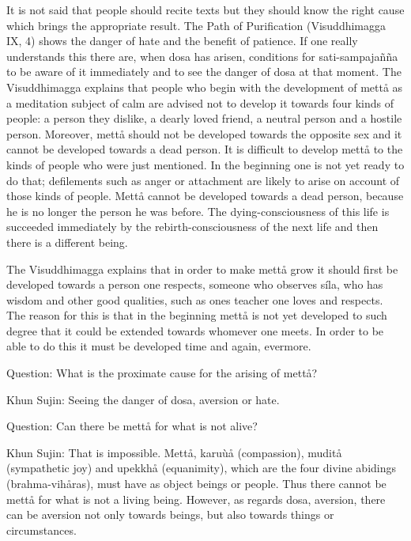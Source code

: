 \documentclass[12pt,twoside]{article}
\begin{document}
\bigskip

It is not said that people should recite texts but they should know the
right cause which brings the appropriate result. The
{\textasciigrave}{\textasciigrave}Path of
Purification{\textquotesingle}{\textquotesingle} (Visuddhimagga IX, 4)
shows the danger of hate and the benefit of patience. If one really
understands this there are, when dosa has arisen, conditions for
sati{}-sampaja\~n\~na to be aware of it immediately and to see the
danger of dosa at that moment. The Visuddhimagga explains that people
who begin with the development of mett{\aa} as a meditation subject of
calm are advised not to develop it towards four kinds of people: a
person they dislike, a dearly loved friend, a neutral person and a
hostile person. Moreover, mett{\aa} should not be developed towards the
opposite sex and it cannot be developed towards a dead person. It is
difficult to develop mett{\aa} to the kinds of people who were just
mentioned. In the beginning one is not yet ready to do that;
defilements such as anger or attachment are likely to arise on account
of those kinds of people. Mett{\aa} cannot be developed towards a dead
person, because he is no longer the person he was before. The
dying{}-consciousness of this life is succeeded immediately by the
rebirth{}-consciousness of the next life and then there is a different
being. 

The Visuddhimagga explains that in order to make mett{\aa} grow it
should first be developed towards a person one respects, someone who
observes s\'ila, who has wisdom and other good qualities, such as
one{\textquotesingle}s teacher one loves and respects. The reason for
this is that in the beginning mett{\aa} is not yet developed to such
degree that it could be extended towards whomever one meets. In order
to be able to do this it must be developed time and again, evermore. 

Question: What is the proximate cause for the arising of mett{\aa}?

Khun Sujin: Seeing the danger of dosa, aversion or hate. 

Question: Can there be mett{\aa} for what is not alive?

Khun Sujin: That is impossible. Mett{\aa}, karu\`u{\aa} (compassion),
mudit{\aa} (sympathetic joy) and upekkh{\aa} (equanimity), which are
the {\textasciigrave}{\textasciigrave}four divine
abidings{\textquotesingle}{\textquotesingle} (brahma{}-vih{\aa}ras),
must have as object beings or people. Thus there cannot be mett{\aa}
for what is not a living being. However, as regards dosa, aversion,
there can be aversion not only towards beings, but also towards things
or circumstances. 
\end{document}
